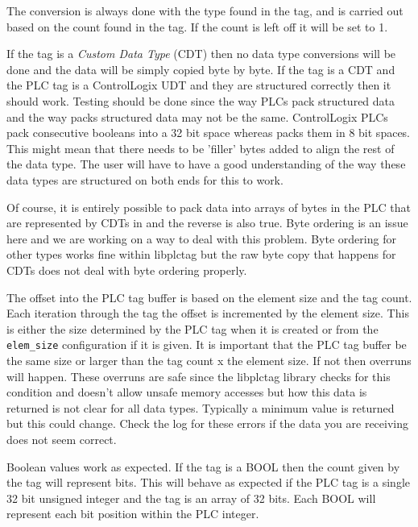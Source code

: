 The conversion is always done with the type found in the \opendax{} tag, and
is carried out based on the count found in the \opendax{} tag.  If the count
is left off it will be set to 1.

If the \opendax{} tag is a \textit{Custom Data Type} (CDT) then no data type
conversions will be done and the data will be simply copied byte by byte.  If
the \opendax{} tag is a CDT and the PLC tag is a ControlLogix UDT and they
are structured correctly then it should work.  Testing should be done since
the way PLCs pack structured data and the way \opendax{} packs structured
data may not be the same.  ControlLogix PLCs pack consecutive booleans into
a 32 bit space whereas \opendax{} packs them in 8 bit spaces.  This might mean
that there needs to be 'filler' bytes added to align the rest of the data
type.  The user will have to have a good understanding of the way these
data types are structured on both ends for this to work.

Of course, it is entirely possible to pack data into arrays of bytes in
the PLC that are represented by CDTs in \opendax{} and the reverse is
also true.  Byte ordering is an issue here and we are working on a way
to deal with this problem.  Byte ordering for other types works fine
within libplctag but the raw byte copy that happens for CDTs does not
deal with byte ordering properly.

The offset into the PLC tag buffer is based on the element size and the 
\opendax{} tag count.  Each iteration through the \opendax{} tag
the offset is incremented by the element size.  This is either the size determined
by the PLC tag when it is created or from the \texttt{elem\_size} configuration
if it is given.  It is important that the PLC tag buffer be the same size
or larger than the \opendax{} tag count x the element size.  If not then
overruns will happen.  These overruns are safe since the libplctag library
checks for this condition and doesn't allow unsafe memory accesses but
how this data is returned is not clear for all data types.  Typically
a minimum value is returned but this could change.  Check the \opendax{}
log for these errors if the data you are receiving does not seem correct.

Boolean values work as expected.  If the \opendax{} tag is a BOOL then
the count given by the tag will represent bits.  This will behave as expected
if the PLC tag is a single 32 bit unsigned integer and the \opendax{} tag is
an array of 32 bits.  Each \opendax{} BOOL will represent each bit position
within the PLC integer.